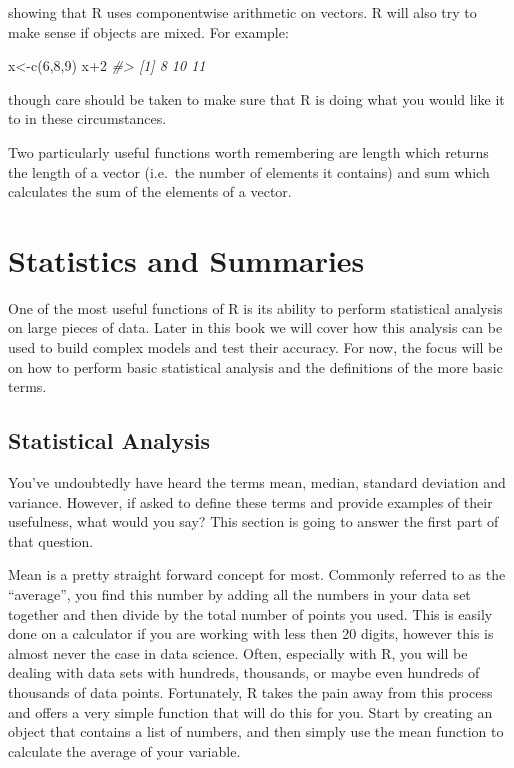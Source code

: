 \documentclass[
]{book}
\newenvironment{Shaded}{\begin{snugshade}}{\end{snugshade}}
\newcommand{\CommentTok}[1]{\textcolor[rgb]{0.56,0.35,0.01}{\textit{#1}}}
\newcommand{\DecValTok}[1]{\textcolor[rgb]{0.00,0.00,0.81}{#1}}
\newcommand{\FunctionTok}[1]{\textcolor[rgb]{0.00,0.00,0.00}{#1}}
\newcommand{\NormalTok}[1]{#1}
\newcommand{\OtherTok}[1]{\textcolor[rgb]{0.56,0.35,0.01}{#1}}
\newcommand{\SpecialCharTok}[1]{\textcolor[rgb]{0.00,0.00,0.00}{#1}}
\begin{document}
showing that R uses componentwise arithmetic on vectors. R will also try to make sense if objects
are mixed. For example:

\begin{Shaded}
\begin{Highlighting}[]
\NormalTok{x}\OtherTok{\textless{}{-}}\FunctionTok{c}\NormalTok{(}\DecValTok{6}\NormalTok{,}\DecValTok{8}\NormalTok{,}\DecValTok{9}\NormalTok{)}
\NormalTok{x}\SpecialCharTok{+}\DecValTok{2}
\CommentTok{\#\textgreater{} [1]  8 10 11}
\end{Highlighting}
\end{Shaded}

though care should be taken to make sure that R is doing what you would like it to in these circumstances.

Two particularly useful functions worth remembering are length which returns the length of a vector (i.e.~the number of elements it contains) and sum which calculates the sum of the elements of a vector.

\hypertarget{statistics-and-summaries}{%
\section{Statistics and Summaries}\label{statistics-and-summaries}}

One of the most useful functions of R is its ability to perform statistical analysis on large pieces of data. Later in this book we will cover how this analysis can be used to build complex models and test their accuracy. For now, the focus will be on how to perform basic statistical analysis and the definitions of the more basic terms.

\hypertarget{statistical-analysis}{%
\subsection{Statistical Analysis}\label{statistical-analysis}}

You've undoubtedly have heard the terms mean, median, standard deviation and variance. However, if asked to define these terms and provide examples of their usefulness, what would you say? This section is going to answer the first part of that question.

Mean is a pretty straight forward concept for most. Commonly referred to as the ``average'', you find this number by adding all the numbers in your data set together and then divide by the total number of points you used. This is easily done on a calculator if you are working with less then 20 digits, however this is almost never the case in data science. Often, especially with R, you will be dealing with data sets with hundreds, thousands, or maybe even hundreds of thousands of data points. Fortunately, R takes the pain away from this process and offers a very simple function that will do this for you. Start by creating an object that contains a list of numbers, and then simply use the mean function to calculate the average of your variable.
\end{document}
